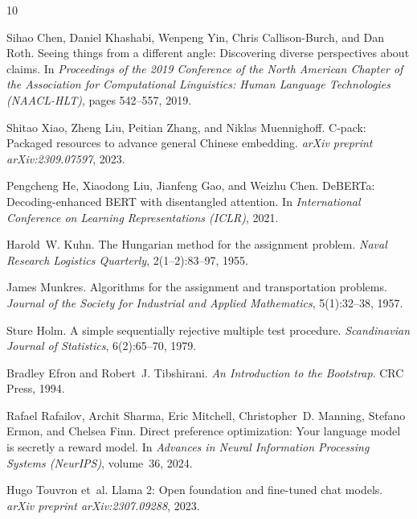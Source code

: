 \documentclass[11pt,a4paper]{article}
\begin{document}
\begin{thebibliography}{10}

Sihao Chen, Daniel Khashabi, Wenpeng Yin, Chris Callison-Burch, and Dan Roth.
\newblock Seeing things from a different angle: Discovering diverse perspectives about claims.
\newblock In \emph{Proceedings of the 2019 Conference of the North American Chapter of the Association for Computational Linguistics: Human Language Technologies (NAACL-HLT)}, pages 542--557, 2019.

Shitao Xiao, Zheng Liu, Peitian Zhang, and Niklas Muennighoff.
\newblock C-pack: Packaged resources to advance general Chinese embedding.
\newblock \emph{arXiv preprint arXiv:2309.07597}, 2023.

Pengcheng He, Xiaodong Liu, Jianfeng Gao, and Weizhu Chen.
\newblock DeBERTa: Decoding-enhanced BERT with disentangled attention.
\newblock In \emph{International Conference on Learning Representations (ICLR)}, 2021.

Harold~W. Kuhn.
\newblock The Hungarian method for the assignment problem.
\newblock \emph{Naval Research Logistics Quarterly}, 2(1--2):83--97, 1955.

James Munkres.
\newblock Algorithms for the assignment and transportation problems.
\newblock \emph{Journal of the Society for Industrial and Applied Mathematics}, 5(1):32--38, 1957.

Sture Holm.
\newblock A simple sequentially rejective multiple test procedure.
\newblock \emph{Scandinavian Journal of Statistics}, 6(2):65--70, 1979.

Bradley Efron and Robert~J. Tibshirani.
\newblock \emph{An Introduction to the Bootstrap}.
\newblock CRC Press, 1994.

Rafael Rafailov, Archit Sharma, Eric Mitchell, Christopher~D. Manning, Stefano Ermon, and Chelsea Finn.
\newblock Direct preference optimization: Your language model is secretly a reward model.
\newblock In \emph{Advances in Neural Information Processing Systems (NeurIPS)}, volume~36, 2024.

Hugo Touvron et~al.
\newblock Llama 2: Open foundation and fine-tuned chat models.
\newblock \emph{arXiv preprint arXiv:2307.09288}, 2023.


\end{thebibliography}
\end{document}
